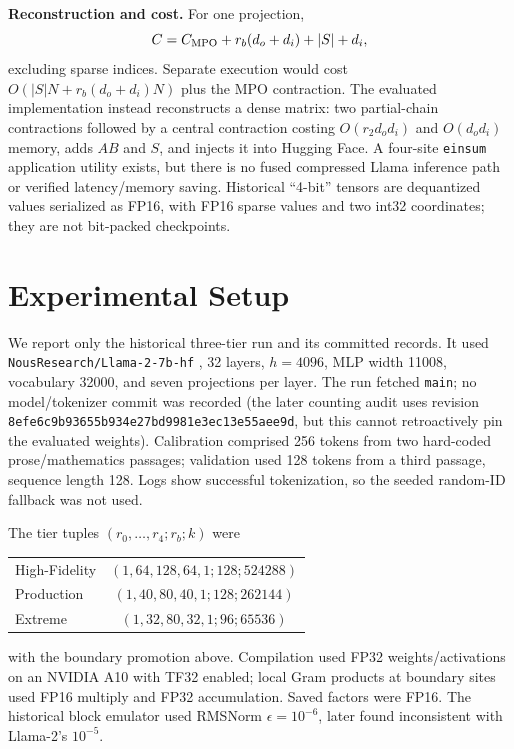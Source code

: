 \documentclass[10pt,twocolumn]{article}
\begin{document}
\textbf{Reconstruction and cost.}
For one projection,
\begin{equation}
 C= C_{\rm MPO}+r_b(d_o+d_i)+|S|+d_i,                  \label{eq:count}
\end{equation}
excluding sparse indices.  Separate execution would cost $O(|S|N+r_b(d_o+d_i)N)$ plus the MPO contraction.  The evaluated implementation instead reconstructs a dense matrix: two partial-chain contractions followed by a central contraction costing $O(r_2d_od_i)$ and $O(d_od_i)$ memory, adds $AB$ and $S$, and injects it into Hugging Face.  A four-site \texttt{einsum} application utility exists, but there is no fused compressed Llama inference path or verified latency/memory saving.  Historical ``4-bit'' tensors are dequantized values serialized as FP16, with FP16 sparse values and two int32 coordinates; they are not bit-packed checkpoints.

\section{Experimental Setup}
We report only the historical three-tier run and its committed records.  It used \texttt{NousResearch/Llama-2-7b-hf} \cite{llama2}, 32 layers, $h=4096$, MLP width 11008, vocabulary 32000, and seven projections per layer.  The run fetched \texttt{main}; no model/tokenizer commit was recorded (the later counting audit uses revision \texttt{8efe6c9b93655b934e27bd9981e3ec13e55aee9d}, but this cannot retroactively pin the evaluated weights).  Calibration comprised 256 tokens from two hard-coded prose/mathematics passages; validation used 128 tokens from a third passage, sequence length 128.  Logs show successful tokenization, so the seeded random-ID fallback was not used.

The tier tuples $(r_0,\ldots,r_4;r_b;k)$ were
\begin{center}\vspace{-2pt}\scriptsize
\begin{tabular}{@{}lc@{}}
High-Fidelity & $(1,64,128,64,1;128;524288)$\\
Production & $(1,40,80,40,1;128;262144)$\\
Extreme & $(1,32,80,32,1;96;65536)$
\end{tabular}\vspace{-2pt}
\end{center}
with the boundary promotion above.  Compilation used FP32 weights/activations on an NVIDIA A10 with TF32 enabled; local Gram products at boundary sites used FP16 multiply and FP32 accumulation.  Saved factors were FP16.  The historical block emulator used RMSNorm $\epsilon=10^{-6}$, later found inconsistent with Llama-2's $10^{-5}$.
\end{document}
